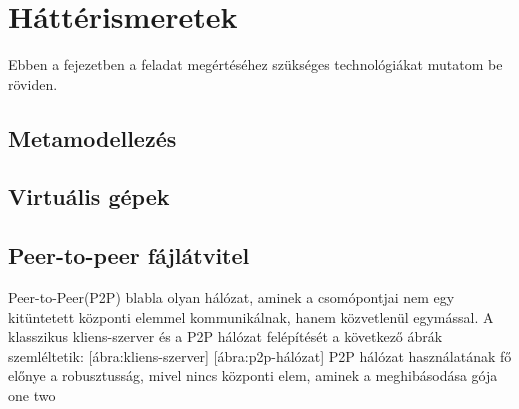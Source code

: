 \chapter{Háttérismeretek}
Ebben a fejezetben a feladat megértéséhez szükséges technológiákat mutatom be röviden. 

\section{Metamodellezés}

\section{Virtuális gépek}

\section{Peer-to-peer fájlátvitel}
Peer-to-Peer(P2P) blabla olyan hálózat, aminek a csomópontjai nem egy kitüntetett központi elemmel 
kommunikálnak, hanem közvetlenül egymással. A klasszikus kliens-szerver és a P2P hálózat felépítését
a következő ábrák szemléltetik:
[ábra:kliens-szerver] [ábra:p2p-hálózat]
P2P hálózat használatának fő előnye a robusztusság, mivel nincs központi elem, aminek a
meghibásodása gója one two
